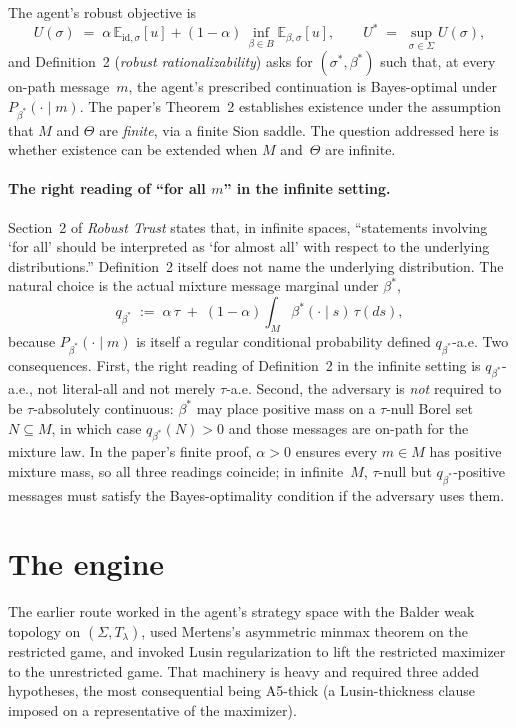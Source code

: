 \documentclass[11pt]{article}
\theoremstyle{definition}
\theoremstyle{remark}
\newcommand{\Th}{\Theta}
\newcommand{\Si}{\Sigma}
\newcommand{\E}{\mathbb{E}}
\begin{document}
The agent's robust objective is
\begin{equation}\label{eq:U}
  U(\sigma) \;=\; \alpha\,\E_{\mathrm{id},\sigma}[u] + (1-\alpha)\,\inf_{\beta\in B}\E_{\beta,\sigma}[u],
  \qquad U^* \;=\; \sup_{\sigma\in\Si} U(\sigma),
\end{equation}
and Definition~2 (\emph{robust rationalizability}) asks for
$(\sigma^*,\beta^*)$ such that, at every on-path message~$m$, the
agent's prescribed continuation is Bayes-optimal under
$P_{\beta^*}(\cdot\mid m)$. The paper's Theorem~2 establishes
existence under the assumption that $M$ and $\Th$ are \emph{finite},
via a finite Sion saddle. The question addressed here is whether
existence can be extended when $M$ and~$\Th$ are infinite.

\paragraph{The right reading of ``for all $m$'' in the infinite setting.}
Section~2 of \emph{Robust Trust} states that, in infinite spaces,
``statements involving `for all' should be interpreted as `for almost
all' with respect to the underlying distributions.'' Definition~2
itself does not name the underlying distribution. The natural choice
is the actual mixture message marginal under $\beta^*$,
\[
  q_{\beta^*} \;:=\; \alpha\,\tau \;+\; (1-\alpha)\!\int_M\!\beta^*(\cdot\mid s)\,\tau(ds),
\]
because $P_{\beta^*}(\cdot\mid m)$ is itself a regular conditional
probability defined $q_{\beta^*}$-a.e. Two consequences. First, the
right reading of Definition~2 in the infinite setting is
$q_{\beta^*}$-a.e., not literal-all and not merely $\tau$-a.e. Second,
the adversary is \emph{not} required to be $\tau$-absolutely
continuous: $\beta^*$ may place positive mass on a $\tau$-null Borel
set $N\subseteq M$, in which case $q_{\beta^*}(N)>0$ and those
messages are on-path for the mixture law. In the paper's finite
proof, $\alpha>0$ ensures every $m\in M$ has positive mixture mass,
so all three readings coincide; in infinite~$M$, $\tau$-null but
$q_{\beta^*}$-positive messages must satisfy the Bayes-optimality
condition if the adversary uses them.

\section{The engine}\label{sec:engine}

The earlier route worked in the agent's strategy space with the
Balder weak topology on $(\Si,T_\lambda)$, used Mertens's asymmetric
minmax theorem on the restricted game, and invoked Lusin
regularization to lift the restricted maximizer to the unrestricted
game. That machinery is heavy and required three added hypotheses,
the most consequential being A5-thick (a Lusin-thickness clause
imposed on a representative of the maximizer).
\end{document}
